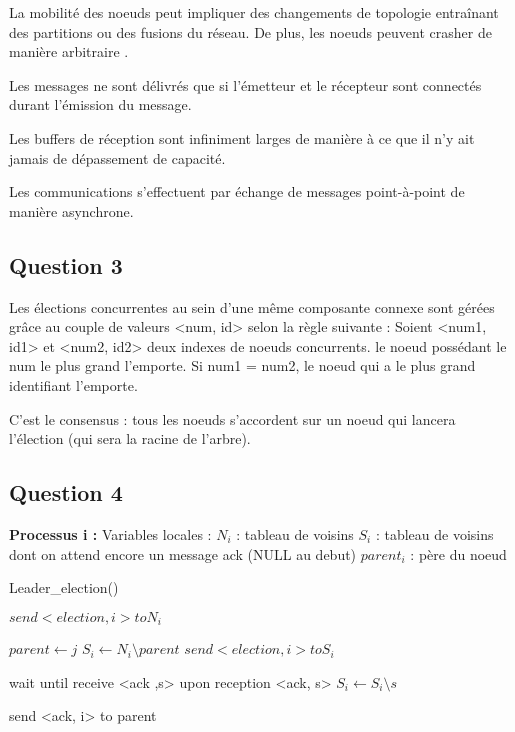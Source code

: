 \documentclass[paper=a4, fontsize=11pt]{article} %
\begin{document}
La mobilité des noeuds peut impliquer des changements de topologie entraînant des partitions ou des fusions du réseau. De plus, les noeuds peuvent crasher de manière arbitraire .

Les messages ne sont délivrés que si l'émetteur et le récepteur sont connectés durant l'émission du message.

Les buffers de réception sont infiniment larges de manière à ce que il n'y ait jamais de dépassement de capacité.

Les communications s'effectuent par échange de messages point-à-point de manière asynchrone.

\subsection{Question 3}

Les élections concurrentes au sein d'une même composante connexe sont gérées grâce au couple de valeurs <num, id> selon la règle suivante :
Soient <num1, id1> et <num2, id2> deux indexes de noeuds concurrents. le noeud possédant le num le plus grand l'emporte.
Si num1 = num2, le noeud qui a le plus grand identifiant l'emporte.

C'est le consensus : tous les noeuds s'accordent sur un noeud qui lancera l'élection (qui sera la racine de l'arbre).


\subsection{Question 4}

\textbf{Processus i :}
\newline
Variables locales : 
\newline
$ N_{i} $ : tableau de voisins 
\newline
$ S_{i} $ : tableau de voisins dont on attend encore un message ack (NULL au debut)
\newline
$ parent_{i} $ : père du noeud
\newline



\begin{algorithm}
   \caption{Leader\_election()}
    \begin{algorithmic}[1]
      \Comment{}
			\State $ send <election, i> to  N_{i}$
		\EndIf
       \EndFunction

      \Comment{}
			\State $parent \gets j$
			\State $ S_{i} \gets N_{i} \setminus parent $
			\State $ send <election, i> to  S_{i}$

				\State  wait until receive <ack ,s>
				\State  upon reception <ack, s> 
				\State $ S_{i} \gets S_{i}\setminus s $ 
			\EndWhile

		\EndIf
		\State  send <ack, i> to parent 
       \EndFunction
\end{algorithmic}
\end{algorithm}
\end{document}
